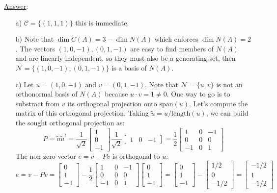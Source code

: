 \documentclass[]{book}
\theoremstyle{definition}
\newcommand{\length}{\textrm{length}}
\newcommand\ans{\underline{Answer}: }
\begin{document}
\begin{enumerate}
\ans
\begin{itemize}
\item[a)] $\mathcal{C}=\{(1,1,1)\}$ this is immediate. 
\item[b)] Note that $\dim C(A) = 3 - \dim N(A)$ which enforces $\dim N(A)=2$. The vectors $(1,0,-1), (0,1,-1)$ are easy to find members of $N(A)$ and are linearly independent, so they must also be a generating set, then $\mathcal{N}=\{(1,0,-1), (0,1,-1) \}$ is a basis of $N(A)$.
\item[c)] Let $u=(1,0,-1)$ and $v=(0,1,-1)$. Note that $\mathcal{N} = \{u,v\}$ is not an orthonormal basis of $N(A)$ because $u\cdot v=1\neq 0$. One way to go is to substract from $v$ its orthogonal projection onto $\textrm{span}(u)$. Let's compute the matrix of this orthogonal projection. Taking $\tilde{u} = u / \length(u)$, we can build the sought orthogonal projection as:
\[
P = \tilde{u}\tilde{u}^t = 
\frac{1}{\sqrt{2}}\begin{bmatrix}
1 \\
0 \\
-1
\end{bmatrix}
\frac{1}{\sqrt{2}}
\begin{bmatrix}
1 & 0 & -1 
\end{bmatrix}
=
\frac{1}{2}\begin{bmatrix}
1 & 0 & -1 \\
0 & 0 & 0 \\
-1 & 0 & 1
\end{bmatrix}
\]
The non-zero vector $e = v - Pv$ is orthogonal to $u$:
\[
e = v - Pv =  
\begin{bmatrix}
0 \\
1 \\
-1
\end{bmatrix}
-\frac{1}{2}\begin{bmatrix}
1 & 0 & -1 \\
0 & 0 & 0 \\
-1 & 0 & 1
\end{bmatrix}
\begin{bmatrix}
0 \\
1 \\
-1
\end{bmatrix} = 
\begin{bmatrix}
0 \\
1 \\
-1
\end{bmatrix}-
\begin{bmatrix}
1/2 \\
0 \\
-1/2
\end{bmatrix}=
\begin{bmatrix}
-1/2 \\
1 \\
-1/2
\end{bmatrix}
\]
\end{itemize}


\end{enumerate}
\end{document}
